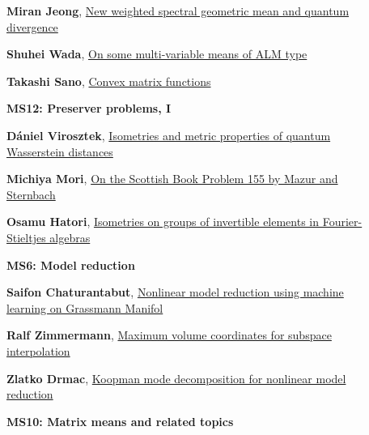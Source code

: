 \documentclass[ILAS2025-program.tex]{subfiles}
\begin{document}
\begin{description}
\begin{description}
    \item[] \hypertarget{up0123}{}\textbf{Miran Jeong}, \hyperlink{down0123}{New weighted spectral geometric mean and quantum divergence}
        \item[] \hypertarget{up0124}{}\textbf{Shuhei Wada}, \hyperlink{down0124}{On some multi-variable means of ALM type}
        \item[] \hypertarget{up0125}{}\textbf{Takashi Sano}, \hyperlink{down0125}{Convex matrix functions}
        \end{description}
    \begin{description}
    \item[] {\color{mstitle}\textbf{MS12: Preserver problems, I}} 
    \item[] \hypertarget{up0126}{}\textbf{Dániel Virosztek}, \hyperlink{down0126}{Isometries and metric properties of quantum Wasserstein distances}
        \item[] \hypertarget{up0127}{}\textbf{Michiya Mori}, \hyperlink{down0127}{On the Scottish Book Problem 155 by Mazur and Sternbach}
        \item[] \hypertarget{up0128}{}\textbf{Osamu Hatori}, \hyperlink{down0128}{Isometries on groups of invertible elements in Fourier-Stieltjes algebras}
        \end{description}
    \begin{description}
    \item[] {\color{mstitle}\textbf{MS6: Model reduction}} 
    \item[] \hypertarget{up0129}{}\textbf{Saifon Chaturantabut}, \hyperlink{down0129}{Nonlinear model reduction using machine learning on Grassmann Manifol}
        \item[] \hypertarget{up0130}{}\textbf{Ralf Zimmermann}, \hyperlink{down0130}{Maximum volume coordinates for subspace interpolation}
        \item[] \hypertarget{up0131}{}\textbf{Zlatko Drmac}, \hyperlink{down0131}{Koopman mode decomposition for nonlinear model reduction}
        \end{description}
    \begin{description}
    \item[] {\color{mstitle}\textbf{MS10: Matrix means and related topics}} 

\end{description}
\end{description}
\end{document}
